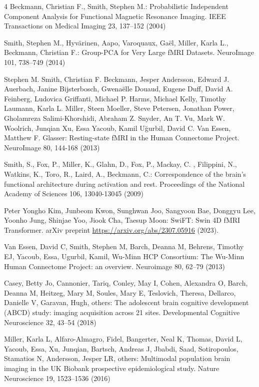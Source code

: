 \documentclass[runningheads,a4paper]{llncs}
\begin{document}
\begin{thebibliography}{4}
 Beckmann, Christian F., Smith, Stephen M.: Probabilistic Independent Component Analysis for Functional Magnetic Resonance Imaging. IEEE Transactions on Medical Imaging 23, 137--152 (2004)

 Smith, Stephen M., Hyvärinen, Aapo, Varoquaux, Gaël, Miller, Karla L., Beckmann, Christian F.: Group-PCA for Very Large fMRI Datasets. NeuroImage 101, 738--749 (2014)

 Stephen M. Smith, Christian F. Beckmann, Jesper Andersson, Edward J. Auerbach, Janine Bijsterbosch, Gwenaëlle Douaud, Eugene Duff, David A. Feinberg, Ludovica Griffanti, Michael P. Harms, Michael Kelly, Timothy Laumann, Karla L. Miller, Steen Moeller, Steve Petersen, Jonathan Power, Gholamreza Salimi-Khorshidi, Abraham Z. Snyder, An T. Vu, Mark W. Woolrich, Junqian Xu, Essa Yacoub, Kamil Uğurbil, David C. {Van Essen}, Matthew F. Glasser: Resting-state fMRI in the Human Connectome Project. NeuroImage 80, 144-168 (2013)

 Smith, S., Fox, P., Miller, K., Glahn, D., Fox, P., Mackay, C. , Filippini, N., Watkins, K., Toro, R., Laird, A., Beckmann, C.: Correspondence of the brain's functional architecture during activation and rest. Proceedings of the National Academy of Sciences 106, 13040-13045 (2009)

 Peter Yongho Kim, Junbeom Kwon, Sunghwan Joo, Sangyoon Bae, Donggyu Lee, Yoonho Jung, Shinjae Yoo, Jiook Cha, Taesup Moon: SwiFT: Swin 4D fMRI Transformer. arXiv preprint \url{https://arxiv.org/abs/2307.05916} (2023).

 Van Essen, David C, Smith, Stephen M, Barch, Deanna M, Behrens, Timothy EJ, Yacoub, Essa, Ugurbil, Kamil, Wu-Minn HCP Consortium: The Wu-Minn Human Connectome Project: an overview. Neuroimage 80, 62--79 (2013)

 Casey, Betty Jo, Cannonier, Tariq, Conley, May I, Cohen, Alexandra O, Barch, Deanna M, Heitzeg, Mary M, Soules, Mary E, Teslovich, Theresa, Dellarco, Danielle V, Garavan, Hugh, others: The adolescent brain cognitive development (ABCD) study: imaging acquisition across 21 sites. Developmental Cognitive Neuroscience 32, 43--54 (2018)

 Miller, Karla L, Alfaro-Almagro, Fidel, Bangerter, Neal K, Thomas, David L, Yacoub, Essa, Xu, Junqian, Bartsch, Andreas J, Jbabdi, Saad, Sotiropoulos, Stamatios N, Andersson, Jesper LR, others: Multimodal population brain imaging in the UK Biobank prospective epidemiological study. Nature Neuroscience 19, 1523--1536 (2016)


\end{thebibliography}
\end{document}
